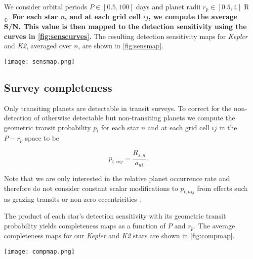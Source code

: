 \documentclass[twocolumn]{emulateapj}
\newcommand{\kepler}[1]{\emph{Kepler}#1}
\newcommand{\ktwo}[1]{\emph{K2}#1}
\begin{document}
We consider orbital periods $P \in [0.5,100]$ days and planet radii $r_p \in [0.5,4]$ R$_{\oplus}$.
\textbf{For each star
$n$, and at each grid cell $ij$, we compute the average S/N. This value is then mapped to the detection sensitivity
using the curves in \autoref{fig:senscurves}.} The resulting detection sensitivity maps for \kepler{} and \ktwo{,}
averaged over $n$, are shown in \autoref{fig:sensmap}.

\begin{figure*}
  \centering
  \texttt{[image: sensmap.png]}
  \caption{Average detection sensitivity versus orbital period and planetary radius.
    The detection sensitivity maps averaged over \kepler{} stars (\emph{left panel)} and over \ktwo{} stars
    (\emph{right panel}) from our sample of low mass dwarf stars.} 
  \label{fig:sensmap}
\end{figure*}


\subsection{Survey completeness} \label{sect:comp}
Only transiting planets are detectable in transit surveys. To correct for the non-detection of otherwise
detectable but non-transiting planets we compute
the geometric transit probability $p_t$ for each star $n$ and at each grid cell $ij$ in the $P-r_p$ space to be

\begin{equation}
  p_{t,nij} = \frac{R_{s,n}}{a_{ni}}. \label{eq:ptransit}
\end{equation}

\noindent Note that we are only interested in the relative planet occurrence rate and therefore do not consider
constant scalar modifications to $p_{t,nij}$ from effects such as grazing transits or non-zero eccentricities 
\citep{barnes07b}.

The product of each star's detection sensitivity with its geometric transit probability yields completeness
maps as a function of $P$ and $r_p$. The average completeness maps for our \kepler{} and \ktwo{} stars are
shown in \autoref{fig:compmap}.

\begin{figure*}
  \centering
  \texttt{[image: compmap.png]}
  \caption{Average completeness versus orbital period and planetary radius.
    Maps of the product of the detection sensitivity and geometric transit probability averaged over \kepler{} stars
    (\emph{left panel)} and over \ktwo{} stars (\emph{right panel}) from our sample of low mass dwarf stars.} 
  \label{fig:compmap}
\end{figure*}
\end{document}
